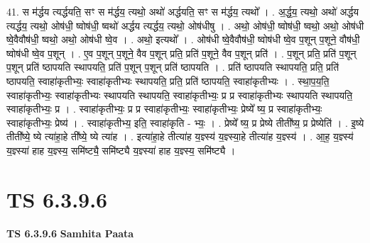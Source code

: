 \documentclass[17pt]{extarticle}
\begin{document}
41. स म॑र्द्धय त्यर्द्धयति॒ सꣳ स म॑र्द्धय॒ त्यथो॒ अथो॑ अर्द्धयति॒ सꣳ स म॑र्द्धय॒ त्यथो᳚ । . अ॒र्द्ध॒य॒ त्यथो॒ अथो॑ अर्द्धय त्यर्द्धय॒ त्यथो॒ ओष॑धी॒ ष्वोष॑धी॒ ष्वथो॑ अर्द्धय त्यर्द्धय॒ त्यथो॒ ओष॑धीषु । . अथो॒ ओष॑धी॒ ष्वोष॑धी॒ ष्वथो॒ अथो॒ ओष॑धी ष्वे॒वैवौष॑धी॒ ष्वथो॒ अथो॒ ओष॑धी ष्वे॒व । . अथो॒ इत्यथो᳚ । . ओष॑धी ष्वे॒वैवौष॑धी॒ ष्वोष॑धी ष्वे॒व प॒शून् प॒शूने॒ वौष॑धी॒ ष्वोष॑धी ष्वे॒व प॒शून् । . ए॒व प॒शून् प॒शूने॒ वैव प॒शून् प्रति॒ प्रति॑ प॒शूने॒ वैव प॒शून् प्रति॑ । . प॒शून् प्रति॒ प्रति॑ प॒शून् प॒शून् प्रति॑ ष्ठापयति स्थापयति॒ प्रति॑ प॒शून् प॒शून् प्रति॑ ष्ठापयति । . प्रति॑ ष्ठापयति स्थापयति॒ प्रति॒ प्रति॑ ष्ठापयति॒ स्वाहा॑कृतीभ्यः॒ स्वाहा॑कृतीभ्यः स्थापयति॒ प्रति॒ प्रति॑ ष्ठापयति॒ स्वाहा॑कृतीभ्यः । . स्था॒प॒य॒ति॒ स्वाहा॑कृतीभ्यः॒ स्वाहा॑कृतीभ्यः स्थापयति स्थापयति॒ स्वाहा॑कृतीभ्यः॒ प्र प्र स्वाहा॑कृतीभ्यः स्थापयति स्थापयति॒ स्वाहा॑कृतीभ्यः॒ प्र । . स्वाहा॑कृतीभ्यः॒ प्र प्र स्वाहा॑कृतीभ्यः॒ स्वाहा॑कृतीभ्यः॒ प्रेष्ये᳚ ष्य॒ प्र स्वाहा॑कृतीभ्यः॒ स्वाहा॑कृतीभ्यः॒ प्रेष्य॑ । . स्वाहा॑कृतीभ्य॒ इति॒ स्वाहा॑कृति - भ्यः॒ । . प्रेष्ये᳚ ष्य॒ प्र प्रेष्ये तीती᳚ष्य॒ प्र प्रेष्येति॑ । . इ॒ष्ये तीती᳚ष्ये॒ ष्ये त्या॑हा॒हे ती᳚ष्ये॒ ष्ये त्या॑ह । . इत्या॑हा॒हे तीत्या॑ह य॒ज्ञ्स्य॑ य॒ज्ञ्स्या॒हे तीत्या॑ह य॒ज्ञ्स्य॑ । . आ॒ह॒ य॒ज्ञ्स्य॑ य॒ज्ञ्स्या॑ हाह य॒ज्ञ्स्य॒ समि॑ष्ट्यै॒ समि॑ष्ट्यै य॒ज्ञ्स्या॑ हाह य॒ज्ञ्स्य॒ समि॑ष्ट्यै । \newline
\pagebreak
{}

\section{ TS 6.3.9.6 }

\textbf{TS 6.3.9.6 } \newline
\textbf{Samhita Paata} \newline
\end{document}
